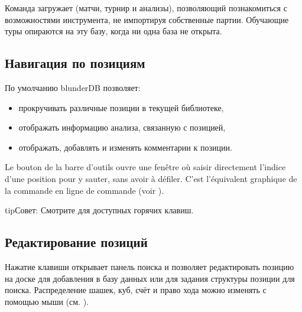 \documentclass[letterpaper,10pt,russian]{sphinxmanual}
\begin{document}
\sphinxAtStartPar
Команда  загружает  (матчи, турнир и анализы), позволяющий познакомиться с возможностями инструмента, не импортируя собственные партии. Обучающие туры опираются на эту базу, когда ни одна база не открыта.


\subsection{Навигация по позициям}
\label{\detokenize{manuel:navigation-dans-les-positions}}\label{\detokenize{manuel:navigation-positions}}
\sphinxAtStartPar
По умолчанию blunderDB позволяет:
\begin{itemize}
\item {} 
\sphinxAtStartPar
прокручивать различные позиции в текущей библиотеке,

\item {} 
\sphinxAtStartPar
отображать информацию анализа, связанную с позицией,

\item {} 
\sphinxAtStartPar
отображать, добавлять и изменять комментарии к позиции.

\end{itemize}

\sphinxAtStartPar
Le bouton  de la barre d’outils ouvre une fenêtre où
saisir directement l’indice d’une position pour y sauter, sans avoir à
défiler. C’est l’équivalent graphique de la commande \sphinxcode{\sphinxupquote{{[}number{]}}} en ligne de
commande (voir {\hyperref[\detokenize{cmd_mode:cmd-positions}]{}}).

\begin{sphinxadmonition}{tip}{Совет:}
\sphinxAtStartPar
Смотрите {\hyperref[\detokenize{raccourcis:raccourcis}]{}} для доступных горячих клавиш.
\end{sphinxadmonition}


\subsection{Редактирование позиций}
\label{\detokenize{manuel:edition-de-positions}}\label{\detokenize{manuel:edition-positions}}
\sphinxAtStartPar
Нажатие клавиши  открывает панель поиска и позволяет редактировать позицию на доске для добавления в базу данных или для задания структуры позиции для поиска. Распределение шашек, куб, счёт и право хода можно изменять с помощью мыши (см. {\hyperref[\detokenize{guide_utilisateur:guide-edit-position}]{}}).
\end{document}
